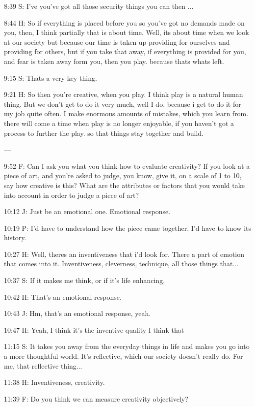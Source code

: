 8:39 S: I've you've got all those security things you can then ...

8:44 H: So if everything is placed before you so you've got no demands made on you, then, I think partially that is about time. Well, its about time when we look at our society but because our time is taken up providing for ourselves and providing for others, but if you take that away, if everything is provided for you, and fear is taken away form you, then you play. because thats whats left.

9:15 S: Thats a very key thing.

9:21 H: So then you're creative, when you play. I think play is a natural human thing. But we don't get to do it very much, well I do, because i get to do it for my job quite often. I make enormous amounts of mistakes, which you learn from. there will come a time when play is no longer enjoyable, if you haven't got a process to further the play. so that things stay together and build.

---

9:52 F: Can I ask you what you think how to evaluate creativity? If you look at a piece of art, and you're asked to judge, you know, give it, on a scale of 1 to 10, say how creative is this? What are the attributes or factors that you would take into account in order to judge a piece of art?

10:12 J: Just be an emotional one. Emotional response.

10:19 P: I'd have to understand how the piece came together. I'd have to know its history.

10:27 H: Well, theres an inventiveness that i'd look for. There a part of emotion that comes into it. Inventiveness, cleverness, technique, all those things that...

10:37 S: If it makes me think, or if it's life enhancing,

10:42 H: That's an emotional response.

10:43 J: Hm, that's an emotional response, yeah.

10:47 H: Yeah, I think it's the inventive quality I think that

11:15 S: It takes you away from the everyday things in life and makes you go into a more thoughtful world. It's reflective, which our society doesn't really do. For me, that reflective thing...

11:38 H: Inventiveness, creativity.

11:39 F: Do you think we can measure creativity objectively?

